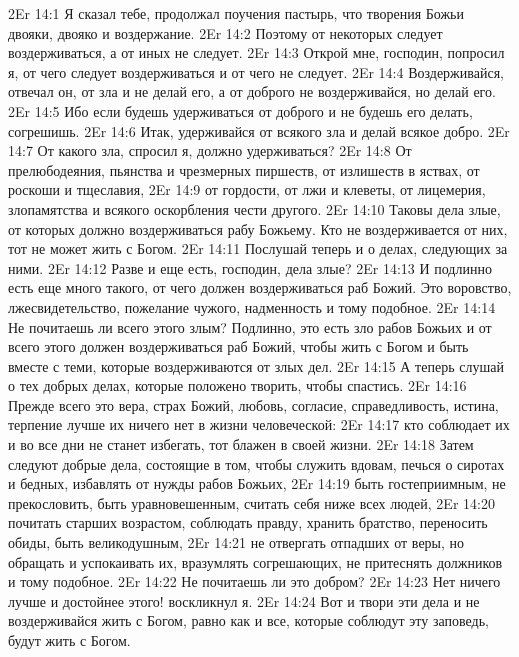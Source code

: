 \vs 2Er 14:1
Я сказал тебе, продолжал поучения пастырь, что творения Божьи двояки, двояко
и воздержание.
\vs 2Er 14:2
Поэтому от некоторых
следует воздерживаться, а от иных не следует.
\vs 2Er 14:3
Открой мне, господин,
попросил я, от чего следует воздерживаться и от чего не следует.
\vs 2Er 14:4
Воздерживайся, отвечал
он, от зла и не делай его, а от доброго не воздерживайся, но делай его.
\vs 2Er 14:5
Ибо если будешь
удерживаться от доброго и не будешь его делать, согрешишь.
\vs 2Er 14:6
Итак, удерживайся от
всякого зла и делай всякое добро.
\vs 2Er 14:7
От какого зла, спросил
я, должно удерживаться?
\vs 2Er 14:8
От прелюбодеяния, пьянства
и чрезмерных пиршеств, от излишеств в яствах, от роскоши и тщеславия,
\vs 2Er 14:9
от гордости, от лжи и
клеветы, от лицемерия, злопамятства и всякого оскорбления чести другого.
\vs 2Er 14:10
Таковы дела злые, от
которых должно воздерживаться рабу Божьему. Кто не воздерживается от них, тот
не может жить с Богом.
\vs 2Er 14:11
Послушай теперь и о
делах, следующих за ними.
\vs 2Er 14:12
Разве и еще есть,
господин, дела злые?
\vs 2Er 14:13
И подлинно есть еще много
такого, от чего должен воздерживаться раб Божий. Это воровство,
лжесвидетельство, пожелание чужого, надменность и тому подобное.
\vs 2Er 14:14
Не почитаешь ли всего
этого злым? Подлинно, это есть зло рабов Божьих и от всего этого должен
воздерживаться раб Божий, чтобы жить с Богом и быть вместе с теми, которые
воздерживаются от злых дел.
\vs 2Er 14:15
А теперь слушай о тех
добрых делах, которые положено творить, чтобы спастись.
\vs 2Er 14:16
Прежде всего это вера,
страх Божий, любовь, согласие, справедливость, истина, терпение лучше их
ничего нет в жизни человеческой:
\vs 2Er 14:17
кто соблюдает их и во все
дни не станет избегать, тот блажен в своей жизни.
\vs 2Er 14:18
Затем следуют добрые
дела, состоящие в том, чтобы служить вдовам, печься о сиротах и бедных,
избавлять от нужды рабов Божьих,
\vs 2Er 14:19
быть гостеприимным, не
прекословить, быть уравновешенным, считать себя ниже всех людей,
\vs 2Er 14:20
почитать старших
возрастом, соблюдать правду, хранить братство, переносить обиды, быть
великодушным,
\vs 2Er 14:21
не отвергать отпадших от
веры, но обращать и успокаивать их, вразумлять согрешающих, не притеснять
должников и тому подобное.
\vs 2Er 14:22
Не почитаешь ли это
добром?
\vs 2Er 14:23
Нет ничего лучше и
достойнее этого! воскликнул я.
\vs 2Er 14:24
Вот и твори эти дела и не
воздерживайся жить с Богом, равно как и все, которые соблюдут эту заповедь,
будут жить с Богом.


